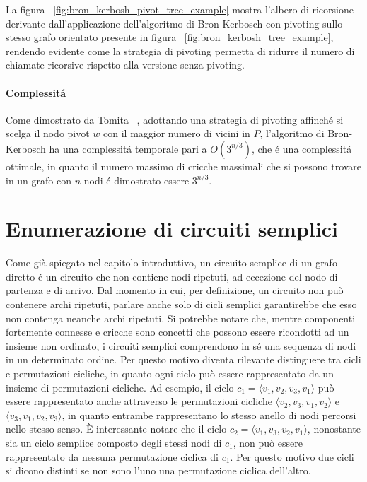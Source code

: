 La figura ~\ref{fig:bron_kerbosh_pivot_tree_example} mostra l'albero di ricorsione derivante dall'applicazione
dell'algoritmo di Bron-Kerbosch con pivoting sullo stesso grafo orientato presente in figura
~\ref{fig:bron_kerbosh_tree_example}, rendendo evidente come la strategia di pivoting permetta di ridurre il numero
di chiamate ricorsive rispetto alla versione senza pivoting.

\paragraph{Complessit\'a} \newline
Come dimostrato da Tomita ~\cite{TOMITA200628}, adottando una strategia di pivoting affinch\'e si scelga il nodo pivot
$w$ con il maggior numero di vicini in $P$, l'algoritmo di Bron-Kerbosch ha una complessit\'a temporale pari a
$O(3^{n/3})$, che \'e una complessit\'a ottimale, in quanto il numero massimo di cricche massimali che si possono
trovare in un grafo con $n$ nodi \'e dimostrato essere $3^{n/3}$.

\section{Enumerazione di circuiti semplici}\label{sec:enumerazione-di-cicli}

Come gi\`a spiegato nel capitolo introduttivo, un circuito semplice di un grafo diretto \'e un circuito
che non contiene nodi ripetuti, ad eccezione del nodo di partenza e di arrivo.
Dal momento in cui, per definizione, un circuito non pu\`o contenere archi ripetuti, parlare anche solo di cicli
semplici garantirebbe che esso non contenga neanche archi ripetuti.
Si potrebbe notare che, mentre componenti fortemente connesse e cricche sono concetti che possono essere
ricondotti ad un insieme non ordinato, i circuiti semplici comprendono in s\'e una sequenza di nodi in un determinato
ordine.
Per questo motivo diventa rilevante distinguere tra cicli e permutazioni cicliche, in quanto ogni ciclo
pu\`o essere rappresentato da un insieme di permutazioni cicliche.
Ad esempio, il ciclo $c_1 = \langle v_1, v_2, v_3, v_1 \rangle$ pu\`o essere rappresentato anche attraverso le
permutazioni cicliche $\langle v_2, v_3, v_1, v_2 \rangle$ e $\langle v_3, v_1, v_2, v_3 \rangle$, in quanto entrambe
rappresentano lo stesso anello di nodi percorsi nello stesso senso. \newline
\`E interessante notare che il ciclo $c_2 = \langle v_1, v_3, v_2, v_1 \rangle$, nonostante sia un ciclo semplice
composto degli stessi nodi di $c_1$, non pu\`o essere rappresentato da nessuna permutazione ciclica di $c_1$.
Per questo motivo due cicli si dicono distinti se non sono l'uno una permutazione ciclica dell'altro. \newline

